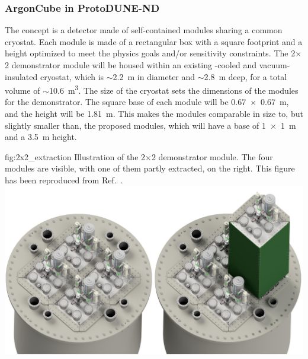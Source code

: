 \subsubsection{ArgonCube in ProtoDUNE-ND}
\label{sec:appx-nd:2x2-design}


The   concept is a detector made of self-contained  modules sharing a common cryostat. Each module is made of a rectangular box with a square footprint and a height optimized to meet the physics goals and/or sensitivity constraints. The  2$\times$2 demonstrator module will be housed within an existing \lntwo-cooled and vacuum-insulated cryostat, 
which is $\sim$\SI{2.2}{\metre} in diameter and $\sim$\SI{2.8}{\metre} deep, for a total volume of $\sim$\SI{10.6}{\metre\cubed}. The size of the cryostat sets the dimensions of the modules for the demonstrator. The square base of each module will be \SI{0.67 x 0.67}{\metre}, and the height will be \SI{1.81}{\metre}. This makes the modules comparable in size to, but slightly smaller than, the proposed     modules, which will have a base of \SI{1 x 1}{\metre} and a \SI{3.5}{\metre} height.


\begin{dunefigure} %
{fig:2x2_extraction}
{Illustration of the  2$\times$2 demonstrator module. The four modules are visible, with one of them partly extracted, on the right. This figure has been reproduced from Ref.~\cite{argoncube_loi}.}
\includegraphics[width=\textwidth]{graphics/BathAndModule.jpeg}
\end{dunefigure}

